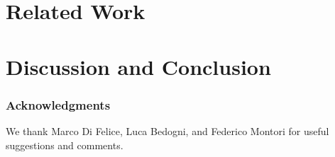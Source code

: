 \documentclass[letterpaper,10pt,final,compsoc]{IEEEtran}
\begin{document}
\section{Related Work}
\label{sec:related}


\section{Discussion and Conclusion}
\label{conclusion}


\subsubsection*{Acknowledgments} %
We thank Marco Di Felice, Luca Bedogni, and Federico Montori for useful
suggestions and comments.




{}
\end{document}
